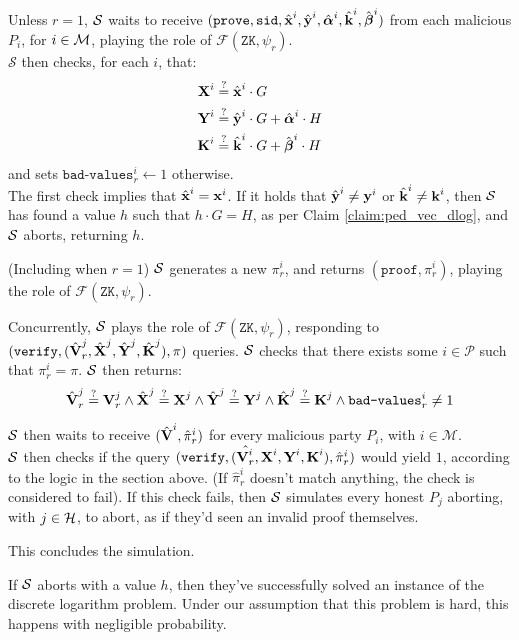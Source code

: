 Unless $r = 1$, $\mathcal{S}$ waits to receive 
$(\texttt{prove}, \texttt{sid}, \hat{\textbf{x}}^i, \hat{\textbf{y}}^i, \hat{\boldsymbol{\alpha}}^i, \hat{\textbf{k}}^i, \hat{\boldsymbol{\beta}}^i)$
from each malicious $P_i$, for $i \in \mathcal{M}$, playing the role of $\mathcal{F}(\texttt{ZK}, \psi_r)$.\\
$\mathcal{S}$ then checks, for each $i$, that:
$$
\begin{aligned}
\textbf{X}^i &\stackrel{?}{=} \hat{\textbf{x}}^i \cdot G\\
\textbf{Y}^i &\stackrel{?}{=} \hat{\textbf{y}}^i \cdot G + \hat{\boldsymbol{\alpha}}^i \cdot H\\
\textbf{K}^i &\stackrel{?}{=} \hat{\textbf{k}}^i \cdot G + \hat{\boldsymbol{\beta}}^i \cdot H
\end{aligned}
$$
and sets $\texttt{bad-values}^i_r \gets 1$ otherwise.\\
The first check implies that $\hat{\textbf{x}}^i = \textbf{x}^i$. If it holds that
$\hat{\textbf{y}}^i \neq \textbf{y}^i$ or $\hat{\textbf{k}}^i \neq \textbf{k}^i$, then $\mathcal{S}$ has
found a value $h$ such that $h \cdot G = H$, as per Claim \ref{claim:ped_vec_dlog},
and $\mathcal{S}$ aborts, returning $h$.

(Including when $r = 1$) $\mathcal{S}$ generates a new $\pi^i_r$, and returns $(\texttt{proof}, \pi^i_r)$,
playing the role of $\mathcal{F}(\texttt{ZK}, \psi_r)$.

Concurrently, $\mathcal{S}$ plays the role of $\mathcal{F}(\texttt{ZK}, \psi_r)$,
responding to $(\texttt{verify}, (\hat{\textbf{V}}^j_r, \hat{\textbf{X}}^j, \hat{\textbf{Y}}^j, \hat{\textbf{K}}^j), \pi)$
queries. $\mathcal{S}$ checks that there exists some $i \in \mathcal{P}$ such that
$\pi^i_r = \pi$. $\mathcal{S}$ then returns:
$$
\hat{\textbf{V}}^j_r \stackrel{?}{=} \textbf{V}^j_r \land
\hat{\textbf{X}}^j \stackrel{?}{=} \textbf{X}^j \land
\hat{\textbf{Y}}^j \stackrel{?}{=} \textbf{Y}^j \land
\hat{\textbf{K}}^j \stackrel{?}{=} \textbf{K}^j \land
\texttt{bad-values}^i_r \neq 1
$$

$\mathcal{S}$ then waits to receive $(\hat{\textbf{V}}^i, \hat{\pi}^i_r)$ for
every malicious party $P_i$, with ${i \in \mathcal{M}}$.\\
$\mathcal{S}$ then checks if the query $(\texttt{verify}, (\hat{\textbf{V}^i_r}, \textbf{X}^i, \textbf{Y}^i, \textbf{K}^i), \hat{\pi}^i_r)$
would yield $1$, according to the logic in the section above.
(If $\hat{\pi}^i_r$ doesn't match anything, the check is considered to fail).
If this check fails, then $\mathcal{S}$ simulates every honest $P_j$ aborting, with $j \in \mathcal{H}$,
to abort, as if they'd seen an invalid proof themselves.

This concludes the simulation.

If $\mathcal{S}$ aborts with a value $h$, then they've successfully
solved an instance of the discrete logarithm problem. Under our
assumption that this problem is hard, this happens with negligible
probability.

